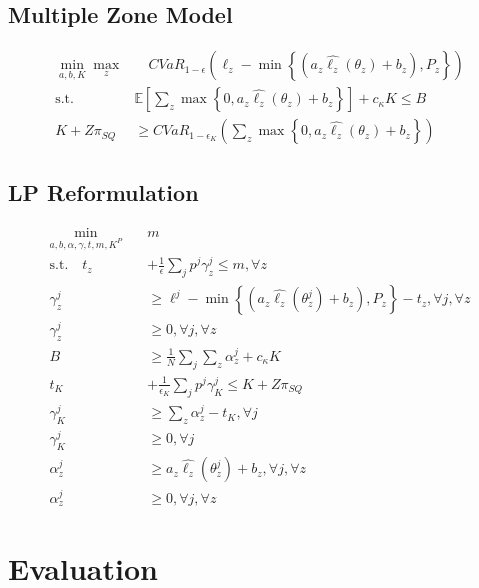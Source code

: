 \documentclass[11pt]{article}
\begin{document}
  \subsection{Multiple Zone Model}
    \begin{align}
        \min_{a,b,K} \max_z &\quad CVaR_{1-\epsilon}\left (\ell_z - \min \left \{ (a_z\hat{\ell_z}(\theta_z) + b_z), P_z \right \} \right )\\
        \text{s.t.   } & \mathbb{E}\left [ \sum_z \max \left \{ 0, a_z\hat{\ell_z}(\theta_z) + b_z \right \} \right ] + c_{\kappa} K \leq B\\
        K + Z\pi_{SQ} &\geq CVaR_{1-\epsilon_K} \left( \sum_z \max \left \{ 0,a_z\hat{\ell_z}(\theta_z) + b_z \right \} \right )
    \end{align}

  \subsection{LP Reformulation}
    \begin{align}
        \min_{a,b,\alpha,\gamma,t,m,K^P} \quad & m\\
        \text{s.t.} \quad t_z &+ \frac{1}{\epsilon} \sum_j p^j \gamma_z^j \leq m, \forall z\\
        \gamma_z^j &\geq \ell^j - \min\left\{(a_z\hat{\ell_z}(\theta_z^j) + b_z), P_z\right\} -t_z, \forall j, \forall z \\
        \gamma_z^j &\geq 0, \forall j, \forall z\\
        B &\geq \frac{1}{N} \sum_j \sum_z \alpha^j_z + c_{\kappa} K\\
        t_K &+ \frac{1}{\epsilon_K} \sum_j p^j \gamma_K^j \leq K+Z\pi_{SQ}\\
        \gamma_K^j &\geq \sum_z \alpha^j_z -t_K, \forall j \\
        \gamma_K^j &\geq 0, \forall j\\
        \alpha^j_z &\geq a_z \hat{\ell_z}(\theta^j_z) + b_z, \forall j, \forall z\\
        \alpha^j_z &\geq 0, \forall j, \forall z
    \end{align}
    
\section{Evaluation}
\end{document}
